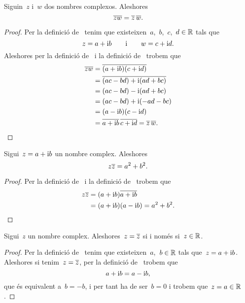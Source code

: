 \documentclass[../Apunts.tex]{subfiles}
\begin{document}
	\begin{proposition}
		\label{prop:el conjugat del producte és el producte de conjugats}
		Siguin~\(z\) i~\(w\) dos nombres complexos. Aleshores
		\[\overline{zw}=\overline{z}\,\overline{w}.\]
	\end{proposition}
	\begin{proof}
		Per la definició de~ tenim que existeixen~\(a\),~\(b\),~\(c\),~\(d\in\mathbb{R}\) tals que
		\[z=a+\mathrm{i} b\qquad\text{i}\qquad w=c+\mathrm{i} d.\]
		Aleshores per la definició de~ i la definició de~ trobem que
		\begin{align*}
			\overline{zw}&=\overline{(a+\mathrm{i} b)(c+\mathrm{i} d)} \\
			&=\overline{(ac-bd)+\mathrm{i}(ad+bc)} \\
			&=(ac-bd)-\mathrm{i}(ad+bc) \\
			&=(ac-bd)+\mathrm{i}(-ad-bc) \\
			&=(a-\mathrm{i} b)(c-\mathrm{i} d) \\
			&=\overline{a+\mathrm{i} b}\,\overline{c+\mathrm{i} d}=\overline{z}\,\overline{w}\qedhere.
		\end{align*}
	\end{proof}
	\begin{proposition}
		\label{prop:el producte d'un nombre complex pel seu conjugat és la suma dels quadrats de la seva part real i imaginaria}
		Sigui~\(z=a+\mathrm{i} b\) un nombre complex. Aleshores
		\[z\overline{z}=a^{2}+b^{2}.\]
	\end{proposition}
	\begin{proof}
		Per la definició de~ i la definició de~ trobem que
		\begin{align*}
			z\overline{z}&=(a+\mathrm{i} b)\overline{a+\mathrm{i} b} \\
			&=(a+\mathrm{i} b)(a-\mathrm{i} b)=a^{2}+b^{2}.\qedhere
		\end{align*}
	\end{proof}
	\begin{proposition}
		\label{prop:un nombre complex és igual al seu conjugat si i només si és un real}
		Sigui~\(z\) un nombre complex. Aleshores~\(z=\overline{z}\) si i només si~\(z\in\mathbb{R}\).
	\end{proposition}
	\begin{proof}
		Per la definició de~ tenim que existeixen~\(a\),~\(b\in\mathbb{R}\) tals que~\(z=a+\mathrm{i} b\). Aleshores si tenim~\(z=\overline{z}\), per la definició de~ trobem que
		\[a+\mathrm{i} b=a-\mathrm{i} b,\]
		que és equivalent a~\(b=-b\), i per tant ha de ser~\(b=0\) i trobem que~\(z=a\in\mathbb{R}\).
	\end{proof}
\end{document}
